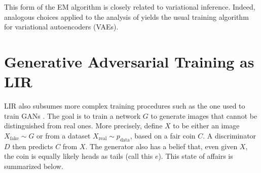 This form of the EM algorithm is closely related to variational inference.
Indeed, analogous choices applied to the analysis of \citet{one-true-loss}
yields the usual training algorithm for variational autoencoders (VAEs).
\section{Generative Adversarial Training as LIR}
\def\pdata{p_{\mathrm{data}}}
\def\real{{\mathrm{real}}}
\def\fake{{\mathrm{fake}}}
LIR also subsumes more complex training procedures such as the one used to train
GANs \cite{goodfellow2020generative}.
The goal is to train a network $G$ to generate images that cannot be distinguished
    from real ones.
%
More precisely, define $X$ to be either an image $X_{\fake}\sim G$ or from a dataset
$X_\real \sim \pdata$, based on a fair coin $C$.
A discriminator $D$ then predicts $C$ from $X$.
%
The generator also has a belief that, even given $X$, the coin is equally likely
heads as tails (call this $e$).
This state of affairs is summarized below.
%
